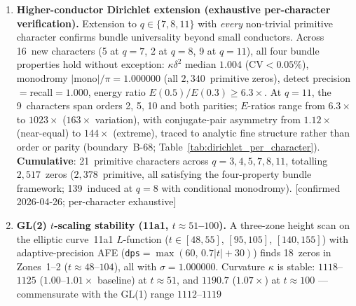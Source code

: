 \documentclass[11pt, a4paper]{article}
\theoremstyle{definition}
\theoremstyle{plain}
\begin{document}
\begin{enumerate}
        due to conductor-induced background, consistent with the
        non-blind result (\#37; $36.6\times$).
        This is the fifth and final blind prediction curve, completing
        the universality test across GL(1) (Riemann~$\zeta$ and Dirichlet)
        and GL(2) (elliptic curves and modular forms).
        Aggregate across all five curves: 66/68~TP, 6~FP,
        $F_1 = 0.943$
        (Table~\ref{tab:gl1_gl2_blind};
        Remark~\ref{rem:gl2_blind_prediction}).
        \textcolor{ForestGreen}{[confirmed 2026-04-16; GL(1) $\chi\bmod 7$ $t\in[5,40]$; numerical verification, not proof]}
  \item \textbf{Higher-conductor Dirichlet extension (exhaustive per-character verification).}
        Extension to $q\in\{7,8,11\}$ with \emph{every} non-trivial
        primitive character confirms bundle universality
        beyond small conductors.
        Across 16~new characters (5 at $q{=}7$, 2 at $q{=}8$,
        9 at $q{=}11$), all four bundle properties hold without exception:
        $\kappa\delta^2$ median $1.004$ (CV${<}0.05\%$),
        monodromy $|\mathrm{mono}|/\pi = 1.000000$ (all $2{,}340$~primitive zeros),
        detect precision${=}$recall${=}1.000$,
        energy ratio $E(0.5)/E(0.3) \geq 6.3\times$.
        At $q{=}11$, the 9~characters span orders 2, 5, 10 and both
        parities; $E$-ratios range from $6.3\times$ to $1023\times$
        ($163\times$ variation), with conjugate-pair asymmetry
        from $1.12\times$ (near-equal) to $144\times$ (extreme),
        traced to analytic fine structure rather than order or parity
        (boundary~B-68; Table~\ref{tab:dirichlet_per_character}).
        \textbf{Cumulative}: 21~primitive characters across
        $q = 3, 4, 5, 7, 8, 11$, totalling $2{,}517$~zeros
        ($2{,}378$~primitive, all satisfying the four-property
        bundle framework; 139~induced at $q{=}8$ with conditional
        monodromy).
        \textcolor{green!60!black}{[confirmed 2026-04-26; per-character exhaustive]}
  \item \textbf{GL(2) $t$-scaling stability (11a1, $t{\approx}51$--$100$).}
        A three-zone height scan on the elliptic curve~11a1 $L$-function
        ($t\in[48,55]$, $[95,105]$, $[140,155]$) with adaptive-precision AFE
        (\texttt{dps}$=\max(60,\,0.7|t|+30)$) finds 18~zeros in Zones~1--2
        ($t\approx 48$--$104$), all with $\sigma=1.000000$.
        Curvature $\kappa$ is stable: $1118$--$1125$ ($1.00$--$1.01\times$
        baseline) at $t\approx 51$, and $1190.7$ ($1.07\times$) at
        $t\approx 100$ --- commensurate with the GL(1) range $1112$--$1119$

\end{enumerate}
\end{document}
